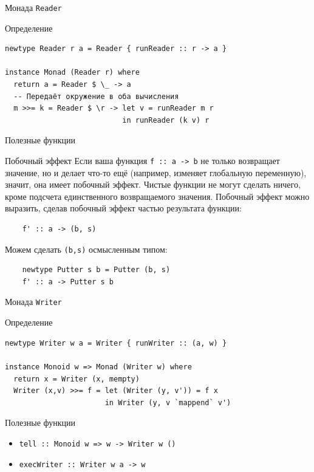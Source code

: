 \documentclass{beamer}
\newcommand{\hs}[1]{\texttt{#1}}
\begin{document}
\begin{frame}[fragile]{Монада \texttt{Reader}}
\begin{block}{Определение}
\begin{verbatim}
newtype Reader r a = Reader { runReader :: r -> a }

instance Monad (Reader r) where
  return a = Reader $ \_ -> a
  -- Передаёт окружение в оба вычисления
  m >>= k = Reader $ \r -> let v = runReader m r
                           in runReader (k v) r
\end{verbatim}
\end{block}
\begin{block}{Полезные функции}
\end{block}
\end{frame}
\begin{frame}[fragile]{Побочный эффект}
    Если ваша функция \hs{f :: a -> b} не только возвращает значение, но и делает что-то ещё (например, изменяет глобальную переменную), значит, она имеет побочный эффект.
    \pause\newline\newline
    Чистые функции не могут сделать ничего, кроме подсчета единственного возвращаемого значения. Побочный эффект можно выразить, сделав побочный эффект частью результата функции:
\begin{verbatim}
    f' :: a -> (b, s)
\end{verbatim}
\pause
Можем сделать \hs{(b,s)} осмысленным типом:
\begin{verbatim}
    newtype Putter s b = Putter (b, s)
    f' :: a -> Putter s b
\end{verbatim}
\end{frame}
\begin{frame}[fragile]{Монада \texttt{Writer}}
\begin{block}{Определение}
\begin{verbatim}
newtype Writer w a = Writer { runWriter :: (a, w) }

instance Monoid w => Monad (Writer w) where
  return x = Writer (x, mempty)
  Writer (x,v) >>= f = let (Writer (y, v')) = f x
                       in Writer (y, v `mappend` v')
\end{verbatim}
\end{block}
\begin{block}{Полезные функции}
\begin{itemize}
    \item \hs{tell :: Monoid w => w -> Writer w ()}
    \item \hs{execWriter :: Writer w a -> w}
\end{itemize}
\end{block}
\end{frame}
\end{document}
